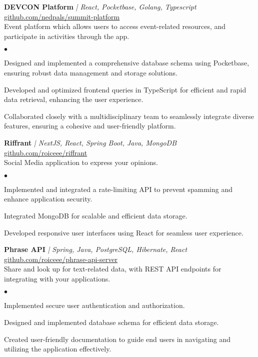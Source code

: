 \documentclass[a4paper]{article}
\newenvironment{achievements}{
        \begin{list}
            {$\bullet$}{\topsep 0pt \itemsep -2pt}}{\vspace*{4pt}
        \end{list}
    }
\begin{document}
    {\textbf{DEVCON Platform}} {\sl | React, Pocketbase, Golang, Typescript} \hfill \href{https://github.com/nedpals/summit-platform}{github.com/nedpals/summit-platform}\\
    \vspace{1mm}
    Event platform which allows users to access event-related resources, and participate in activities through the app.\\
        \begin{achievements}
        \item Designed and implemented a comprehensive database schema using Pocketbase, ensuring robust data management and storage solutions.
        \item Developed and optimized frontend queries in TypeScript for efficient and rapid data retrieval, enhancing the user experience.
        \item Collaborated closely with a multidisciplinary team to seamlessly integrate diverse features, ensuring a cohesive and user-friendly platform.
    \end{achievements}
    \vspace*{3mm}
        {\textbf{Riffrant}} {\sl | NextJS, React, Spring Boot, Java, MongoDB} \hfill \href{https://github.com/roiceee/riffrant}{github.com/roiceee/riffrant}\\
    \vspace{1mm}
    Social Media application to express your opinions.\\
    \begin{achievements}
       \item Implemented and integrated a rate-limiting API to prevent spamming and enhance application security.
        \item Integrated MongoDB for scalable and efficient data storage.
        \item Developed responsive user interfaces using React for seamless user experience.
    \end{achievements}
    \vspace*{3mm}

    {\textbf{Phrase API}} {\sl | Spring, Java, PostgreSQL, Hibernate, React} \hfill \href{https://github.com/roiceee/phrase-api-server}{github.com/roiceee/phrase-api-server}\\
    \vspace{1mm}
    Share and look up for text-related data, with REST API endpoints for integrating with your applications.\\
    \begin{achievements}
        \item Implemented secure user authentication and authorization.
        \item Designed and implemented database schema for efficient data storage.
        \item Created user-friendly documentation to guide end users in navigating and utilizing the application effectively.
    \end{achievements}
\end{document}
